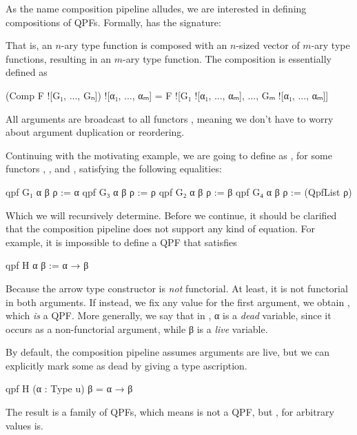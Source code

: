 As the name composition pipeline alludes, we are interested in defining compositions of QPFs. Formally,  has the signature:
\begin{center}
\end{center}
That is, an $n$-ary type function  is composed with an $n$-sized vector of $m$-ary type functions, resulting in an $m$-ary type function. The composition is essentially defined as
\begin{leancode}
    (Comp F ![G₁, ..., Gₙ]) ![α₁, ..., αₘ] 
                = F ![G₁ ![α₁, ..., αₘ], ..., Gₘ ![α₁, ..., αₘ]]
\end{leancode}
All arguments  are broadcast to all functors , meaning we don't have to worry about argument duplication or reordering.

Continuing with the motivating example, we are going to define  as , for some functors , ,  and , satisfying the following equalities:
\begin{leancode}
  qpf G₁ α β ρ := α                qpf G₃ α β ρ := ρ
  qpf G₂ α β ρ := β                qpf G₄ α β ρ := (QpfList ρ)
\end{leancode}

Which we will recursively determine.
Before we continue, it should be clarified that the composition pipeline does not support any kind
of equation. For example, it is impossible to define a QPF that satisfies
\begin{badleancode}
  qpf H α β := α → β 
\end{badleancode}
Because the arrow type constructor  is \emph{not} functorial. 
At least, it is not functorial in both arguments. If instead, we fix any value  for the
first argument, we obtain , which \emph{is} a QPF.\@
More generally, we say that in , α is a \emph{dead} variable, since it occurs as a non-functorial argument, while β is a \emph{live} variable.

By default, the composition pipeline assumes arguments are live, but we can explicitly mark some as dead
by giving a type ascription. 
\begin{leancode}
  qpf H (α : Type u) β = α → β 
\end{leancode}
The result is a family of QPFs, which means  is not a QPF, but , for arbitrary values  is.




